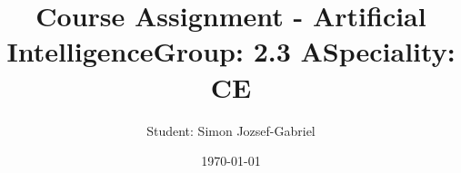 \documentclass[14pt]{article}
\begin{document}
\title{\huge Course Assignment - Artificial Intelligence}
\date{\today}
\maketitle
\begin{center}
\vspace{30 mm}

\author{\huge Student: Simon Jozsef-Gabriel}
\\\vspace{10 mm}
\title{\huge Group: 2.3 A}
\\\vspace{10 mm}
\title{\huge Speciality: CE}
\date{}
\maketitle
\newpage
\end{center}
\tableofcontents
\newpage
\end{document}
